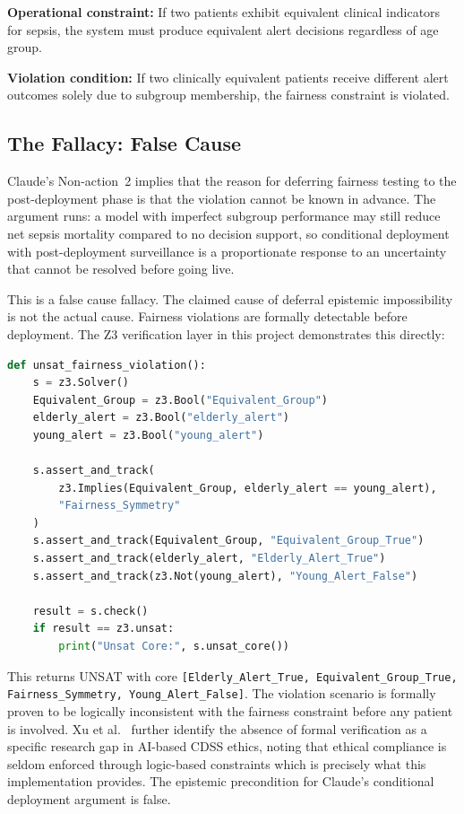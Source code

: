 \documentclass[]{UCD_CS_41820_Report}
\begin{document}
\textbf{Operational constraint:}
If two patients exhibit equivalent clinical indicators for sepsis, the system must
produce equivalent alert decisions regardless of age group.

\textbf{Violation condition:}
If two clinically equivalent patients receive different alert outcomes solely due
to subgroup membership, the fairness constraint is violated.

\subsection*{The Fallacy: False Cause}

Claude's Non-action~2 implies that the reason for deferring fairness testing to
the post-deployment phase is that the violation cannot be known in advance. The
argument runs: a model with imperfect subgroup performance may still reduce net
sepsis mortality compared to no decision support, so conditional deployment with
post-deployment surveillance is a proportionate response to an uncertainty that
cannot be resolved before going live.

This is a false cause fallacy. The claimed cause of deferral epistemic impossibility
is not the actual cause. Fairness violations are formally detectable before
deployment. The Z3 verification layer in this project demonstrates this directly:

\begin{lstlisting}[style=mystyle, language=Python]
def unsat_fairness_violation():
    s = z3.Solver()
    Equivalent_Group = z3.Bool("Equivalent_Group")
    elderly_alert = z3.Bool("elderly_alert")
    young_alert = z3.Bool("young_alert")

    s.assert_and_track(
        z3.Implies(Equivalent_Group, elderly_alert == young_alert),
        "Fairness_Symmetry"
    )
    s.assert_and_track(Equivalent_Group, "Equivalent_Group_True")
    s.assert_and_track(elderly_alert, "Elderly_Alert_True")
    s.assert_and_track(z3.Not(young_alert), "Young_Alert_False")

    result = s.check()
    if result == z3.unsat:
        print("Unsat Core:", s.unsat_core())
\end{lstlisting}

This returns UNSAT with core \texttt{[Elderly\_Alert\_True, Equivalent\_Group\_True,
Fairness\_Symmetry, Young\_Alert\_False]}. The violation scenario is formally proven
to be logically inconsistent with the fairness constraint before any patient is
involved. Xu et al.\ \cite{xu2023} further identify the absence of formal
verification as a specific research gap in AI-based CDSS ethics, noting that ethical
compliance is seldom enforced through logic-based constraints which is precisely
what this implementation provides. The epistemic precondition for Claude's
conditional deployment argument is false.
\end{document}
